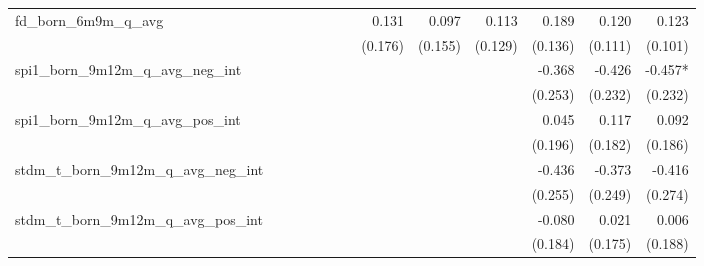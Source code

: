 \begin{tabular}{lrrrrrrrrrrrr}
fd\_born\_6m9m\_q\_avg                      &              &              &              &              &              &              &        0.131 &        0.097 &        0.113 &        0.189 &        0.120 &        0.123 \\ 
                                            &              &              &              &              &              &              &      (0.176) &      (0.155) &      (0.129) &      (0.136) &      (0.111) &      (0.101) \\ 
spi1\_born\_9m12m\_q\_avg\_neg\_int         &              &              &              &              &              &              &              &              &              &       -0.368 &       -0.426 &      -0.457* \\ 
                                            &              &              &              &              &              &              &              &              &              &      (0.253) &      (0.232) &      (0.232) \\ 
spi1\_born\_9m12m\_q\_avg\_pos\_int         &              &              &              &              &              &              &              &              &              &        0.045 &        0.117 &        0.092 \\ 
                                            &              &              &              &              &              &              &              &              &              &      (0.196) &      (0.182) &      (0.186) \\ 
stdm\_t\_born\_9m12m\_q\_avg\_neg\_int      &              &              &              &              &              &              &              &              &              &       -0.436 &       -0.373 &       -0.416 \\ 
                                            &              &              &              &              &              &              &              &              &              &      (0.255) &      (0.249) &      (0.274) \\ 
stdm\_t\_born\_9m12m\_q\_avg\_pos\_int      &              &              &              &              &              &              &              &              &              &       -0.080 &        0.021 &        0.006 \\ 
                                            &              &              &              &              &              &              &              &              &              &      (0.184) &      (0.175) &      (0.188) \\ 

\end{tabular}

